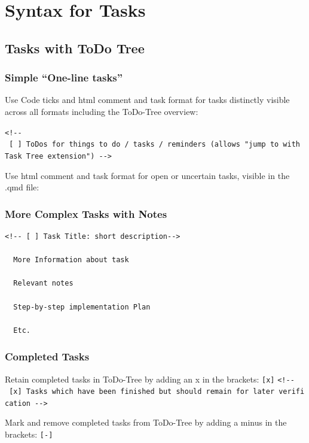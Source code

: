 \documentclass[
  11pt,
  letterpaper,
]{book}
\begin{document}
\section{Syntax for Tasks}\label{syntax-for-tasks-1}

\subsection{Tasks with ToDo Tree}\label{tasks-with-todo-tree-1}

\subsubsection{Simple ``One-line tasks''}\label{simple-one-line-tasks-1}

Use Code ticks and html comment and task format for tasks distinctly
visible across all formats including the ToDo-Tree overview:

\texttt{\textless{}!-\/-\ {[}\ {]}\ ToDos\ for\ things\ to\ do\ /\ tasks\ /\ reminders\ (allows\ "jump\ to\ with\ Task\ Tree\ extension")\ -\/-\textgreater{}}

Use html comment and task format for open or uncertain tasks, visible in
the .qmd file:

\subsubsection{More Complex Tasks with
Notes}\label{more-complex-tasks-with-notes-1}

\begin{verbatim}
<!-- [ ] Task Title: short description-->

  More Information about task

  Relevant notes

  Step-by-step implementation Plan

  Etc.
\end{verbatim}

\subsubsection{Completed Tasks}\label{completed-tasks-1}

Retain completed tasks in ToDo-Tree by adding an x in the brackets:
\texttt{{[}x{]}}
\texttt{\textless{}!-\/-\ {[}x{]}\ Tasks\ which\ have\ been\ finished\ but\ should\ remain\ for\ later\ verification\ -\/-\textgreater{}}

Mark and remove completed tasks from ToDo-Tree by adding a minus in the
brackets: \texttt{{[}-{]}}
\end{document}
